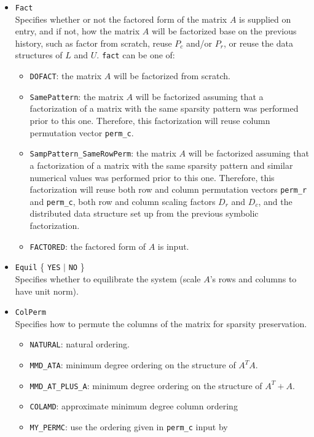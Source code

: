 \begin{itemize}
\item {\tt Fact}\\
    Specifies whether or not the factored form of the matrix
    $A$ is supplied on entry, and if not, how the matrix $A$ will
    be factorized base on the previous history, such as factor from
    scratch, reuse $P_c$ and/or $P_r$, or reuse the data structures of $L$
    and $U$. 
    {\tt fact} can be one of:
    \begin{itemize}
    \item {\tt DOFACT}: the matrix $A$ will be factorized from scratch.
    \item {\tt SamePattern}: the matrix $A$ will be factorized assuming
	that a factorization of a matrix with the same sparsity pattern
	was performed prior to this one. Therefore, this factorization
        will reuse column permutation vector {\tt perm\_c}.
    \item {\tt SampPattern\_SameRowPerm}: the matrix $A$ will be factorized
	assuming that a factorization of a matrix with the same sparsity
	pattern and similar numerical values was performed prior to this one.
        Therefore, this factorization will reuse both row and column
        permutation vectors {\tt perm\_r} and {\tt perm\_c}, both row and
	column scaling factors $D_r$ and $D_c$, and the distributed data
	structure set up from the previous symbolic factorization.
    \item {\tt FACTORED}: the factored form of $A$ is input.
    \end{itemize}
\item {\tt Equil}  \{ {\tt YES} $|$ {\tt NO} \} \\
    Specifies whether to equilibrate the system (scale $A$'s rows and columns
    to have unit norm).
\item {\tt ColPerm}\\
    Specifies how to permute the columns of the matrix for sparsity
    preservation.
    \begin{itemize}
    \item {\tt NATURAL}: natural ordering.
    \item {\tt MMD\_ATA}: minimum degree ordering on the structure of
			$A^TA$.
    \item {\tt MMD\_AT\_PLUS\_A}: minimum degree ordering on the
			structure of $A^T+A$.
    \item {\tt COLAMD}: approximate minimum degree column ordering
    \item {\tt MY\_PERMC}: use the ordering given in {\tt perm\_c} input by

\end{itemize}
\end{itemize}
